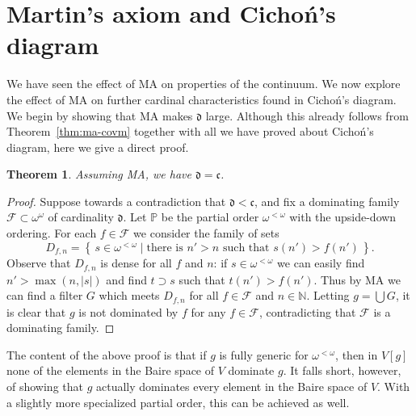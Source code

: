 \documentclass[11pt,oneside]{amsbook}
\newcommand{\set}[1]{\left\{\,#1\,\right\}}
\newcommand{\N}{\mathbb N}
\newcommand{\PP}{\mathbb P}
\theoremstyle{definition}
\theoremstyle{plain}
\newtheorem{theorem}{Theorem}[section]
\theoremstyle{definition}
\theoremstyle{remark}
\numberwithin{equation}{section}
\numberwithin{figure}{section}
\begin{document}



\newpage
\section{Martin's axiom and Cicho\'n's diagram}

We have seen the effect of MA on properties of the continuum. We now explore the effect of MA on further cardinal characteristics found in Cicho\'n's diagram. We begin by showing that MA makes $\mathfrak d$ large. Although this already follows from Theorem~\ref{thm:ma-covm} together with all we have proved about Cicho\'n's diagram, here we give a direct proof.

\begin{theorem}
  \label{thm:ma-d}
  Assuming MA, we have $\mathfrak d=\mathfrak c$.
\end{theorem}

\begin{proof}
  Suppose towards a contradiction that $\mathfrak d<\mathfrak c$, and fix a dominating family $\mathcal F\subset\omega^\omega$ of cardinality $\mathfrak d$. Let $\PP$ be the partial order $\omega^{<\omega}$ with the upside-down ordering. For each $f\in\mathcal F$ we consider the family of sets
  \[D_{f,n}=\set{s\in\omega^{<\omega}\mid\text{there is $n'>n$ such that $s(n')>f(n')$}}\text{.}
  \]
  Observe that $D_{f,n}$ is dense for all $f$ and $n$: if $s\in\omega^{<\omega}$ we can easily find $n'>\max(n,|s|)$ and find $t\supset s$ such that $t(n')>f(n')$. Thus by MA we can find a filter $G$ which meets $D_{f,n}$ for all $f\in\mathcal F$ and $n\in\N$. Letting $g=\bigcup G$, it is clear that $g$ is not dominated by $f$ for any $f\in\mathcal F$, contradicting that $\mathcal F$ is a dominating family.
\end{proof}

The content of the above proof is that if $g$ is fully generic for $\omega^{<\omega}$, then in $V[g]$ none of the elements in the Baire space of $V$ dominate $g$. It falls short, however, of showing that $g$ actually dominates every element in the Baire space of $V$. With a slightly more specialized partial order, this can be achieved as well.
\end{document}
